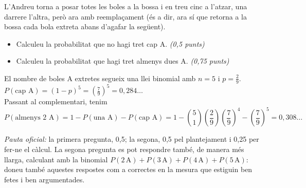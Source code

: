 \begin{apartats}
L'Andreu torna a posar totes les boles a la bossa i en treu cinc a l'atzar, una darrere l'altra, però ara amb
reemplaçament (és a dir, ara sí que retorna a la bossa cada bola extreta abans d'agafar la següent).
\begin{itemize}
\item[---] Calculeu la probabilitat que no hagi tret cap A. \emph{(0,5 punts)}
\item[---] Calculeu la probabilitat que hagi tret almenys dues A. \emph{(0,75 punts)}
\end{itemize}

\begin{solucio}
El nombre de boles A extretes segueix una llei binomial amb $n=5$ i $p=\frac29$.\\
$P(\text{cap A})=(1-p)^5=\left(\frac79\right)^5=0{,}284\ldots$\\
Passant al complementari, tenim
\[
P(\text{almenys 2 A})=1-P(\text{una A})-P(\text{cap A})=1-\binom51\left(\frac29\right)\left(\frac79\right)^4-\left(\frac79\right)^5
=0{,}308\ldots
\]

\textit{Pauta oficial:} la primera pregunta, 0,5; la segona, 0,5 pel plantejament i 0,25 per fer-ne el càlcul.
La segona pregunta es pot respondre també, de manera més llarga, calculant amb la binomial
$P(2\,\text{A})+P(3\,\text{A})+P(4\,\text{A})+P(5\,\text{A})$: doneu també aquestes respostes com a correctes en
la mesura que estiguin ben fetes i ben argumentades.
\end{solucio}

\end{apartats}
